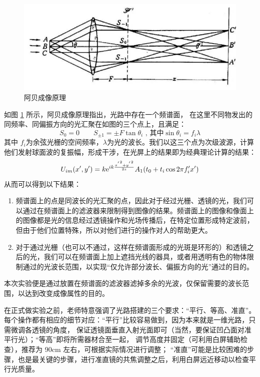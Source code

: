 \documentclass[UTF8]{article}
\theoremstyle{MyLineTheoremStyle} %
\theoremstyle{MyBlockTheoremStyle} %
\theoremstyle{MySubsubsectionStyle} %
\begin{document}
\begin{figure}[H]\centering
    \includegraphics[width=0.8\columnwidth]{assets/1 阿贝尔/阿贝尔原理.png}
    \caption{阿贝成像原理}\label{阿贝成像原理}
\end{figure}

如图 \ref{阿贝成像原理} 所示，阿贝成像原理指出，光路中存在一个频谱面，
在这里不同物发出的同频率、同偏振方向的光汇聚在如图的三个点上，且满足：
\begin{equation}
    S_0=0\qquad S_{\pm 1} = \pm F\tan{\theta_i}\text{ , 其中}\sin{\theta_i} = f_i\lambda
\end{equation}
其中 $f_i$为余弦光栅的空间频率，$\lambda$为光的波长。我们以这三个点为次级波源，计算他们发射球面波的复振幅，形成干涉，在光屏上的结果即为经典理论计算的结果：
\begin{equation}
    U_{im}(x',y')=k{\rm e}^{ik\frac{{x^{'}}^2+{y^{'}}^2}{2z}}A_1(t_0+t_i\cos 2\pi f'_ix')
\end{equation}
从而可以得到以下结果：

\begin{enumerate}
\item 频谱面上的点是同波长的光汇聚的点，因此对于经过光栅、透镜的光，我们可以通过在频谱面上的滤波器来限制得到图像的结果。频谱面上的图像和像面上的图像都是光的信息经过透镜操作和光场传播后，在特定位置形成特定波前，但由于他们位置特殊，所以对他们进行的操作对人的帮助更大。
\item 对于通过光栅（也可以不通过，这样在频谱面形成的光斑是环形的）和透镜之后的光，我们可以在频谱面上加上遮挡光线的器具，或者用透明有色的物体限制通过的光波长范围，以实现“仅允许部分波长、偏振方向的光”通过的目的。
\end{enumerate}

本次实验便是通过放置在频谱面的滤波器滤掉多余的光波，仅保留需要的波长范围，以达到改变成像属性的目的。


在正式做实验之前，老师特意强调了光路搭建的三个要求：“平行、等高、准直”。
每个操作都有相应的细节对应：“平行”比较容易做到，因为本来就是一维光路，只需微调各透镜的角度，
保证透镜面垂直入射光面即可（当然，要保证凹凸面对准平行光）；“等高”即将所需器材合至一起，
调节高度并固定（可利用白屏辅助检查），推荐为 90cm 左右，可根据实际情况进行调整；
“准直”可能是比较困难的步骤，也是最关键的步骤，进行准直镜的共焦调整之后，利用白屏远近移动以检查平行光质量。
\end{document}
